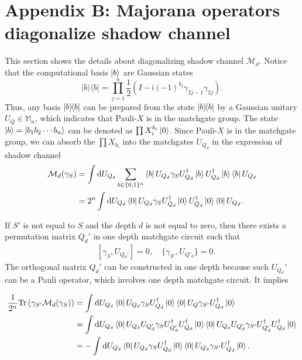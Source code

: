 \documentclass[journal=jctcce,a4paper,manuscript=article]{achemso}
\newcommand{\ii}{\mathsf{i}}
\newcommand{\tra}[1]{\text{Tr}\left( #1 \right)}
\newcommand{\Mbb}{\mathbb{M}}
\begin{document}
\section{Appendix B: Majorana operators diagonalize shadow channel}
\label{appendix: 1}

This section shows the details about diagonalizing shadow channel
$\mathcal{M}_d$. Notice that the computational basis $\ket{b}$ are Gaussian
states
\begin{equation}
  |b\rangle\langle b|=\prod_{j=1}^n \frac{1}{2}\left(I-\ii(-1)^{b_j} \gamma_{2 j-1} \gamma_{2 j}\right).
\end{equation}
Thus, any basis $\ketbra{b}{b}$ can be prepared from the state $\ketbra{b}{b}$ by a Gaussian unitary $U_Q\in \Mbb_n$, which indicates that Pauli-$X$ is in the matchgate group.
The state $\ket{b}= \ket{b_1b_2\cdots b_n}$ can be denoted as $\prod X_{i}^{b_i} \ket{0}$.
Since Pauli-$X$ is in the matchgate group, we can absorb the $\prod X_{b_i}$ into the matchgates $U_{Q_d}$ in the expression of shadow channel
\begin{align}
  \mathcal{M}_d(\gamma_S) & = \int \dd U_{Q_d}\sum_{b\in\{0,1\}^n}\bra{b}U_{Q_d}\gamma_S U_{Q_d}^\dagger \ket{b} U_{Q_d}^\dagger \ket{b}\bra{b}U_{Q_d} \\
                          & = 2^n\int \dd U_{Q_d} \bra{0}U_{Q_d}\gamma_S U_{Q_d}^\dagger \ket{0} U_{Q_d}^\dagger \ket{0}\bra{0}U_{Q_d}.
\end{align}

If $S'$ is not equal to $ S$ and the depth $d$ is not equal to zero, then there
exists a permutation matrix $Q_d'$ in one depth matchgate circuit such that
\begin{align}
  \quad [\gamma_{S}, U_{Q_d'}] = 0, \quad \{\gamma_{S'}, U_{Q'_d}\} = 0.
\end{align}
The orthogonal matrix $Q_d'$ can be constructed in one depth because such $U_{Q_d}'$ can be a Pauli operator, which involves one depth matchgate circuit. It implies

\begin{align}
  \frac{1}{2^n}\tra{\gamma_{S'} \mathcal{M}_d(\gamma_S)} & =
  \int \dd U_{Q_d} \bra{0} U_{Q_d} \gamma_S U_{Q_d}^\dagger \ket{0}\bra{0}U_Q \gamma_{S'} U_{Q_d}^\dagger\ket{0}                                                                                                                \\
                                                         & =\int \dd U_{Q_d} \bra{0}U_{Q_d} U_{Q'_d} \gamma_S U_{Q'_d}^\dagger U_{Q_d}^\dagger\ket{0}\bra{0}U_{Q_d} U_{Q'_d}\gamma_{S'} U_{Q'_d}^\dagger U_{Q_d}^\dagger\ket{0} \\
                                                         & = -\int \dd U_{Q_d} \bra{0}U_{Q_d} \gamma_S U_{Q_d}^\dagger\ket{0}\bra{0}U_{Q_d} \gamma_{S'} U_{Q_d}^\dagger\ket{0}.
\end{align}
\end{document}
